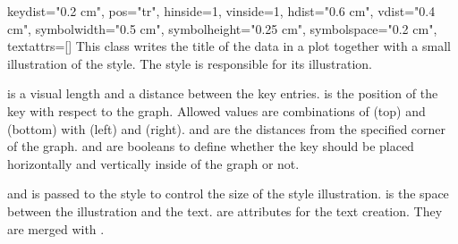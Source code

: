 \begin{classdesc}{key}{dist="0.2 cm", pos="tr", hinside=1, vinside=1,
                       hdist="0.6 cm", vdist="0.4 cm",
                       symbolwidth="0.5 cm", symbolheight="0.25 cm",
                       symbolspace="0.2 cm", textattrs=[]}
  This class writes the title of the data in a plot together with a
  small illustration of the style. The style is responsible for its
  illustration.

   is a visual length and a distance between the key
  entries.  is the position of the key with respect to the
  graph. Allowed values are combinations of  (top) and
   (bottom) with  (left) and  (right).
   and  are the distances from the specified
  corner of the graph.  and  are booleans to
  define whether the key should be placed horizontally and vertically
  inside of the graph or not.

   and  is passed to the style to
  control the size of the style illustration.  is the
  space between the illustration and the text.  are
  attributes for the text creation. They are merged with
  .
\end{classdesc}

